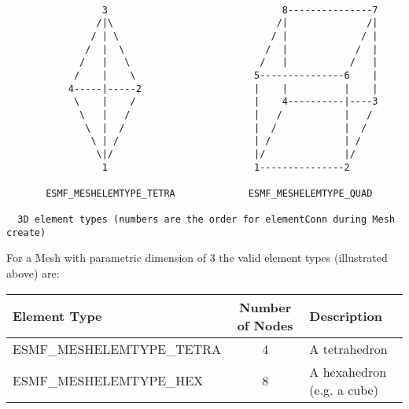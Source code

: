 \begin{verbatim}
                                            
                 3                               8---------------7
                /|\                             /|              /|
               / | \                           / |             / |
              /  |  \                         /  |            /  |
             /   |   \                       /   |           /   |
            /    |    \                     5---------------6    |
           4-----|-----2                    |    |          |    |
            \    |    /                     |    4----------|----3
             \   |   /                      |   /           |   /
              \  |  /                       |  /            |  /
               \ | /                        | /             | /
                \|/                         |/              |/
                 1                          1---------------2

       ESMF_MESHELEMTYPE_TETRA             ESMF_MESHELEMTYPE_QUAD  

  3D element types (numbers are the order for elementConn during Mesh create)

\end{verbatim}

For a Mesh with parametric dimension of 3 the valid element types (illustrated above) are:

\smallskip

\begin{tabular}{|l|c|l|}
\hline
Element Type & Number of Nodes & Description \\
\hline
ESMF\_MESHELEMTYPE\_TETRA & 4 & A tetrahedron \\
ESMF\_MESHELEMTYPE\_HEX  & 8 & A hexahedron (e.g. a cube) \\
\hline
\end{tabular}
